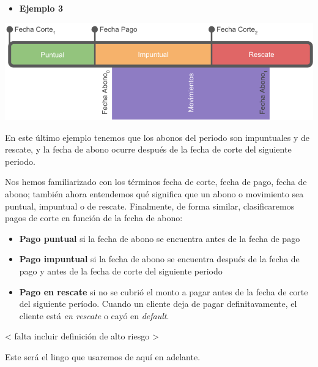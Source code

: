 \documentclass[]{book}
\providecommand{\tightlist}{%
  \setlength{\itemsep}{0pt}\setlength{\parskip}{0pt}}
\begin{document}
\begin{itemize}
\tightlist
\item
  \textbf{Ejemplo 3}
\end{itemize}

\includegraphics{images/movs_3.png}

En este último ejemplo tenemos que los abonos del periodo son impuntuales y de rescate, y la fecha de abono ocurre después de la fecha de corte del siguiente periodo.

Nos hemos familiarizado con los términos fecha de corte, fecha de pago, fecha de abono; también ahora entendemos qué significa que un abono o movimiento sea puntual, impuntual o de rescate. Finalmente, de forma similar, clasificaremos pagos de corte en función de la fecha de abono:

\begin{itemize}
\tightlist
\item
  \textbf{Pago puntual} si la fecha de abono se encuentra antes de la fecha de pago
\item
  \textbf{Pago impuntual} si la fecha de abono se encuentra después de la fecha de pago y antes de la fecha de corte del siguiente periodo
\item
  \textbf{Pago en rescate} si no se cubrió el monto a pagar antes de la fecha de corte del siguiente período. Cuando un cliente deja de pagar definitavamente, el cliente está \emph{en rescate} o cayó en \emph{default}.
\end{itemize}

\textless{} falta incluir definición de alto riesgo \textgreater{}

Este será el lingo que usaremos de aquí en adelante.


\end{document}
